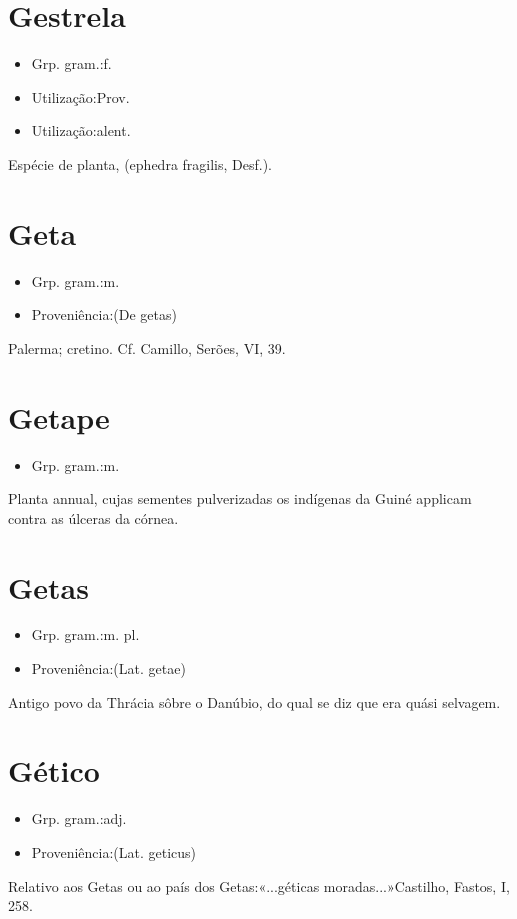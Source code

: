 \section{Gestrela}
\begin{itemize}
\item {Grp. gram.:f.}
\end{itemize}
\begin{itemize}
\item {Utilização:Prov.}
\end{itemize}
\begin{itemize}
\item {Utilização:alent.}
\end{itemize}
Espécie de planta, (\textunderscore ephedra fragilis\textunderscore , Desf.).
\section{Geta}
\begin{itemize}
\item {Grp. gram.:m.}
\end{itemize}
\begin{itemize}
\item {Proveniência:(De \textunderscore getas\textunderscore )}
\end{itemize}
Palerma; cretino. Cf. Camillo, \textunderscore Serões\textunderscore , VI, 39.
\section{Getape}
\begin{itemize}
\item {Grp. gram.:m.}
\end{itemize}
Planta annual, cujas sementes pulverizadas os indígenas da Guiné applicam contra as úlceras da córnea.
\section{Getas}
\begin{itemize}
\item {Grp. gram.:m. pl.}
\end{itemize}
\begin{itemize}
\item {Proveniência:(Lat. \textunderscore getae\textunderscore )}
\end{itemize}
Antigo povo da Thrácia sôbre o Danúbio, do qual se diz que era quási selvagem.
\section{Gético}
\begin{itemize}
\item {Grp. gram.:adj.}
\end{itemize}
\begin{itemize}
\item {Proveniência:(Lat. \textunderscore geticus\textunderscore )}
\end{itemize}
Relativo aos Getas ou ao país dos Getas:«\textunderscore ...géticas moradas...\textunderscore »Castilho, \textunderscore Fastos\textunderscore , I, 258.
